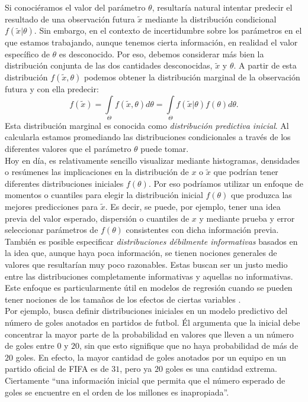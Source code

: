 {Si conociéramos el valor del parámetro $\theta$, resultaría natural intentar predecir el resultado de una observación futura $\tilde{x}$ mediante la distribución condicional $f(\tilde{x}|\theta)$. Sin embargo, en el contexto de incertidumbre sobre los parámetros en el que estamos trabajando, aunque tenemos cierta información, en realidad el valor específico de $\theta$ es desconocido. Por eso, debemos considerar más bien la distribución conjunta de las dos cantidades desconocidas, $\tilde{x}$ y $\theta$. A partir de esta distribución $f(\tilde{x},\theta)$ podemos obtener la distribución marginal de la observación futura y con ella predecir: 
\begin{equation*} 
f(\tilde{x})=\int\limits_\Theta f(\tilde{x},\theta)d\theta=\int\limits_\Theta f(\tilde{x}|\theta)f(\theta)d\theta.
\end{equation*}
Esta distribución marginal es conocida como \textit{distribución predictiva inicial}. Al calcularla estamos promediando las distribuciones condicionales a través de los diferentes valores que el parámetro $\theta$ puede tomar.\\

Hoy en día, es relativamente sencillo visualizar mediante histogramas, densidades o resúmenes las implicaciones en la distribución de $x$ o $\tilde{x}$ que podrían tener diferentes distribuciones iniciales $f(\theta)$. Por eso podríamos utilizar un enfoque de momentos o cuantiles para elegir la distribución inicial $f(\theta)$ que produzca las mejores predicciones para $\tilde{x}$. Es decir, se puede, por ejemplo, tener una idea previa del valor esperado, dispersión o cuantiles de $x$ y mediante prueba y error seleccionar parámetros de $f(\theta)$ consistentes con dicha información previa.\\

También es posible especificar \textit{distribuciones débilmente informativas} basados en la idea que, aunque haya poca información, se tienen nociones generales de valores que resultarían muy poco razonables. Estas buscan ser un justo medio entre las distribuciones completamente informativas y aquellas no informativas. Este enfoque es particularmente útil en modelos de regresión cuando se pueden tener nociones de los tamaños de los efectos de ciertas variables \parencite{Gelman13}.\\ 

Por ejemplo, \textcite{Regueiro12} busca definir distribuciones iniciales en un modelo predictivo del número de goles anotados en partidos de futbol. Él argumenta que la inicial debe concentrar la mayor parte de la probabilidad en valores que lleven a un número de goles entre $0$ y $20$, sin que esto signifique que no haya probabilidad de más de $20$ goles. En efecto, la mayor cantidad de goles anotados por un equipo en un partido oficial de FIFA es de $31$, pero ya $20$ goles es una cantidad extrema. Ciertamente ``una información inicial que permita que el número esperado de goles se encuentre en el orden de los millones es inapropiada''. 

}
